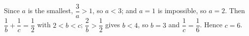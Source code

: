 Since $a$ is the smallest, $\dfrac{3}{a}>1$, so $a<3$; and $a=1$ is impossible, so $a=2$. Then $\dfrac{1}{b}+\dfrac{1}{c}=\dfrac{1}{2}$ with $2<b<c$; $\dfrac{2}{b}>\dfrac{1}{2}$ gives $b<4$, so $b=3$ and $\dfrac{1}{c}=\dfrac{1}{6}$. Hence $c=\boxed{6}$.
